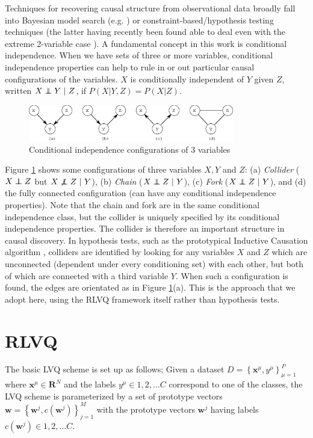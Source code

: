 \documentclass{esannV2}
\newcommand\independent{\protect\mathpalette{\protect\independenT}{\perp}}
\def\independenT#1#2{\mathrel{\rlap{$#1#2$}\mkern2mu{#1#2}}}
\def\ci{\independent}
\def\dep{\not\independent}
\begin{document}
Techniques for recovering causal structure from observational data broadly fall into Bayesian model search (e.g. \cite{chickering03}) or constraint-based/hypothesis testing techniques \cite{06} (the latter having recently been found able to deal even with the extreme 2-variable case \cite{peters10}). A fundamental concept in this work is conditional independence. When we have sets of three or more variables, conditional independence properties can help to rule in or out particular causal configurations of the variables. $X$ is conditionally independent of $Y$ given $Z$, written $X \ci Y\ |\ Z$, if $P(X|Y,Z) = P(X|Z)$. 

\begin{figure}
	\centering
		\includegraphics[width=0.80\textwidth]{vstructure.eps}
	\caption{Conditional independence configurations of 3 variables}
	\label{fig:vstructure}
\end{figure}

Figure \ref{fig:vstructure} shows some configurations of three variables $X,Y$ and $Z$: (a) \emph{Collider} ($X \ci Z$ but $X \dep Z\ |\ Y$), (b) \emph{Chain} ($X \ci Z\ |\ Y$), (c) \emph{Fork} ($X \ci Z\ |\ Y$), and (d) the fully connected configuration (can have any conditional independence properties). Note that the chain and fork are in the same conditional independence class, but the collider is uniquely specified by its conditional independence properties. The collider is therefore an important structure in causal discovery. In hypothesis tests, such as the prototypical Inductive Causation algorithm \cite[\S 2.5]{06}, colliders are identified by looking for any variables $X$ and $Z$ which are unconnected (dependent under every conditioning set) with each other, but both of which are connected with a third variable $Y$. When such a configuration is found, the edges are orientated as in Figure \ref{fig:vstructure}(a). This is the approach that we adopt here, using the RLVQ framework itself rather than hypothesis tests.

\section{RLVQ}
\label{sec:RLVQ}

The basic LVQ scheme is set up as follows; Given a dataset $D = \left\{\textbf{x}^\mu, y^\mu\right\}^P_{\mu = 1}$ where $\textbf{x}^\mu \in \textbf{R}^N$ and the labels $y^\mu \in {1,2,\ldots C}$ correspond to one of the classes, the LVQ scheme is parameterized by a set of prototype vectors $\textbf{w} = \left\{\textbf{w}^j, c(\textbf{w}^j)\right\}^M_{j=1}$ with the prototype vectors $\textbf{w}^j$ having labels $c(\textbf{w}^j) \in {1,2,\dots C}$.
\end{document}
